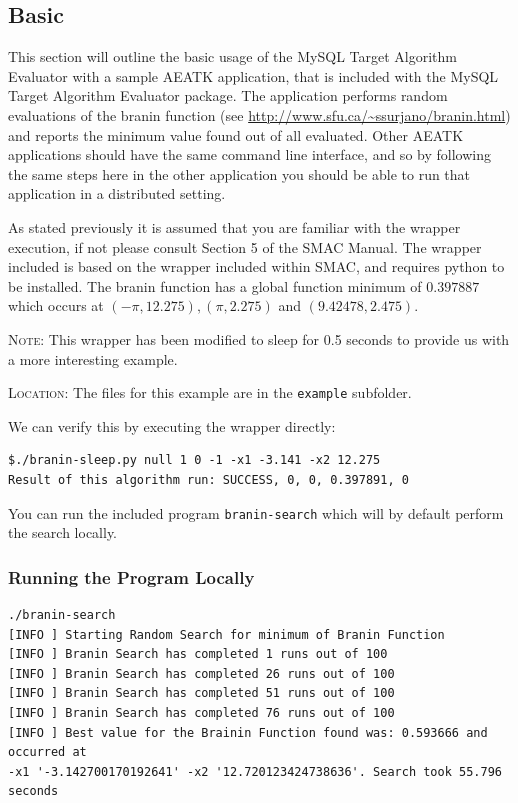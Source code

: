\documentclass[11pt,letterpaper,oneside]{article}
\begin{document}
\subsection{Basic}

This section will outline the basic usage of the MySQL Target Algorithm Evaluator with a sample AEATK application, that is included with the MySQL Target Algorithm Evaluator package. The application performs random evaluations of the branin function (see \url{http://www.sfu.ca/~ssurjano/branin.html}) and reports the minimum value found out of all evaluated. Other AEATK applications should have the same command line interface, and so by following the same steps here in the other application you should be able to run that application in a distributed setting.

As stated previously it is assumed that you are familiar with the wrapper execution, if not please consult Section 5 of the SMAC Manual. The wrapper included is based on the wrapper included within SMAC, and requires python to be installed. The branin function has a global function minimum of $0.397887$ which occurs at $(-\pi, 12.275), (\pi, 2.275)$ and $(9.42478, 2.475)$.

\vspace{5pt}
\textsc{Note}: This wrapper has been modified to sleep for 0.5 seconds to provide us with a more interesting example.

\vspace{5pt}
\textsc{Location}: The files for this example are in the \texttt{example} subfolder.

We can verify this by executing the wrapper directly:
\begin{verbatim}
$./branin-sleep.py null 1 0 -1 -x1 -3.141 -x2 12.275
Result of this algorithm run: SUCCESS, 0, 0, 0.397891, 0
\end{verbatim}

You can run the included program \texttt{branin-search} which will by default perform the search locally. 

\subsubsection{Running the Program Locally}


\begin{verbatim}
./branin-search
[INFO ] Starting Random Search for minimum of Branin Function
[INFO ] Branin Search has completed 1 runs out of 100
[INFO ] Branin Search has completed 26 runs out of 100
[INFO ] Branin Search has completed 51 runs out of 100
[INFO ] Branin Search has completed 76 runs out of 100
[INFO ] Best value for the Brainin Function found was: 0.593666 and occurred at 
-x1 '-3.142700170192641' -x2 '12.720123424738636'. Search took 55.796 seconds
\end{verbatim}
\end{document}
